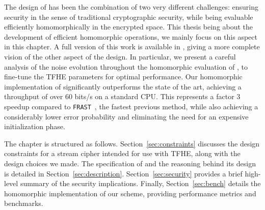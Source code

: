 The design of \coolName has been the combination of two very different challenges: ensuring security in the sense of traditional cryptographic security, while being evaluable efficiently homomorphically in the encrypted space. This thesis being about the development of efficient homomorphic operations, we mainly focus on this aspect in this chapter. A full version of this work is available in \cite{EPRINT:BBBBCL25}, giving a more complete vision of the other aspect of the design. In particular, we present a careful analysis of the noise evolution throughout  the homomorphic evaluation of \coolName, to fine-tune the TFHE parameters for optimal performance. Our homomorphic implementation of \coolName{} significantly outperforms the state of the art, achieving a throughput of over 60 bits/s on a standard CPU. This represents a factor 3 speedup compared to \texttt{FRAST}~\cite{ToSC:CCHLOS24}, the fastest previous method, while also achieving a considerably lower error probability and eliminating the need for an expensive initialization phase.


The chapter is structured as follows. Section~\ref{sec:constraints} discusses the design constraints for a stream cipher intended for use with TFHE, along with the design choices we made. The specification of \coolName{} and the reasoning behind its design is detailed in Section~\ref{sec:description}. Section~\ref{sec:security} provides a brief high-level summary of the security implications. Finally, Section~\ref{sec:bench} details the homomorphic implementation of our scheme, providing performance metrics and benchmarks.

